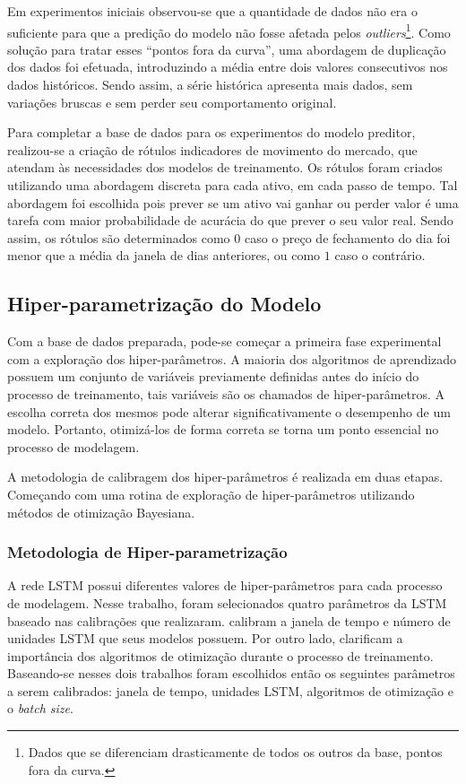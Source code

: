 Em experimentos iniciais observou-se que a quantidade de dados não era o suficiente para que a predição do modelo não fosse afetada pelos \emph{outliers}\footnote{Dados que se diferenciam drasticamente de todos os outros da base, pontos fora da curva.}. Como solução para tratar esses ``pontos fora da curva'', uma abordagem de duplicação dos dados foi efetuada, introduzindo a média entre dois valores consecutivos nos dados históricos. Sendo assim, a série histórica apresenta mais dados, sem variações bruscas e sem perder seu comportamento original. 

Para completar a base de dados para os experimentos do modelo preditor, realizou-se a criação de rótulos indicadores de movimento do mercado, que atendam às necessidades dos modelos de treinamento. Os rótulos foram criados utilizando uma abordagem discreta para cada ativo, em cada passo de tempo. Tal abordagem foi escolhida pois prever se um ativo vai ganhar ou perder valor é uma tarefa com maior probabilidade de acurácia do que prever o seu valor real. Sendo assim, os rótulos são determinados como $0$ caso o preço de fechamento do dia foi menor que a média da janela de dias anteriores, ou como $1$ caso o contrário. 

\subsection{Hiper-parametrização do Modelo}
\label{exp:hyper}

Com a base de dados preparada, pode-se começar a primeira fase experimental com a exploração dos hiper-parâmetros. A maioria dos algoritmos de aprendizado possuem um conjunto de variáveis previamente definidas antes do início do processo de treinamento, tais variáveis são os chamados de hiper-parâmetros. A escolha correta dos mesmos pode alterar significativamente o desempenho de um modelo. Portanto, otimizá-los de forma correta se torna um ponto essencial no processo de modelagem.

A metodologia de calibragem dos hiper-parâmetros é realizada em duas etapas. Começando com uma rotina de exploração de hiper-parâmetros utilizando métodos de otimização Bayesiana.

\subsubsection{Metodologia de Hiper-parametrização}

A rede \acrshort{LSTM} possui diferentes valores de hiper-parâmetros para cada processo de modelagem. Nesse trabalho, foram selecionados quatro parâmetros da \acrshort{LSTM} baseado nas calibrações que \textcite{random_forest_macroeconomic, ga_optimized_lstm} realizaram. \textcite{ga_optimized_lstm} calibram a janela de tempo e número de unidades \acrshort{LSTM} que seus modelos possuem. Por outro lado, \textcite{random_forest_macroeconomic} clarificam a importância dos algoritmos de otimização durante o processo de treinamento. Baseando-se nesses dois trabalhos foram escolhidos então os seguintes parâmetros a serem calibrados: janela de tempo, unidades \acrshort{LSTM}, algoritmos de otimização e o \textit{batch size}.

